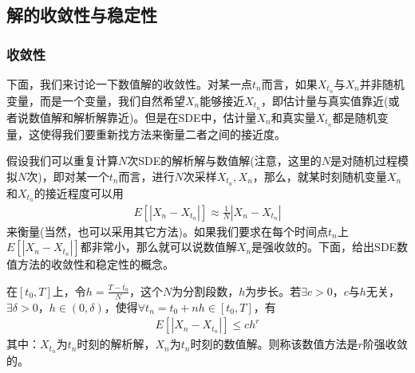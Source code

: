     \subsection{解的收敛性与稳定性}
        \label{subsec:解的收敛性与稳定性}
        \subsubsection{收敛性}
            \label{subsubsec:收敛性}
            \par
            下面，我们来讨论一下数值解的收敛性。对某一点$t_n$而言，如果$X_{t_n}$与$X_n$并非随机变量，而是一个变量，我们自然希望$X_n$能够接近$X_{t_n}$，即估计量与真实值靠近(或者说数值解和解析解靠近)。但是在SDE中，估计量$X_n$和真实量$X_{t_n}$都是随机变量，这使得我们要重新找方法来衡量二者之间的接近度。
            \par
            假设我们可以重复计算$N$次SDE的解析解与数值解(注意，这里的$N$是对随机过程模拟$N$次)，即对某一个$t_n$而言，进行$N$次采样$X_{t_n},X_n$，那么，就某时刻随机变量$X_n$和$X_{t_n}$的接近程度可以用
            \begin{align*}
            E[|X_n - X_{t_n}|]\approx \frac{1}{N} |X_n - X_{t_n}|
            \end{align*}
            来衡量(当然，也可以采用其它方法)。如果我们要求在每个时间点$t_n$上$E[|X_n - X_{t_n}|]$都非常小，那么就可以说数值解$X_n$是强收敛的。下面，给出SDE数值方法的收敛性和稳定性的概念。
            \begin{definition}[强收敛]
                在$[t_0,T]$上，令$h = \frac{T-t_0}{N}$，这个$N$为分割段数，$h$为步长。若$\exists c>0$，$c$与$h$无关，$\exists \delta > 0$，$h\in (0,\delta)$，使得$\forall t_n = t_0+nh\in [t_0,T]$，有
                \begin{align*}
                E[|X_n- X_{t_n}|] \leqslant ch^r
                \end{align*}
                其中：$X_{t_n}$为$t_n$时刻的解析解，$X_n$为$t_n$时刻的数值解。则称该数值方法是$r$阶强收敛的。
            \end{definition}

